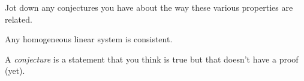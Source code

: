 \documentclass[hidelinks,12pt,handout]{ximera}
\begin{document}
\begin{question} Jot down any conjectures you have about the way these various properties are related.

\begin{prompt}
	\begin{freeResponse}
			Any homogeneous linear system is consistent.
	\end{freeResponse}
\end{prompt}

\begin{hint} A \textit{conjecture} is a statement that you think is true but that doesn't have a proof (yet). 
\end{hint}
\vfill
\end{question}
\end{document}
